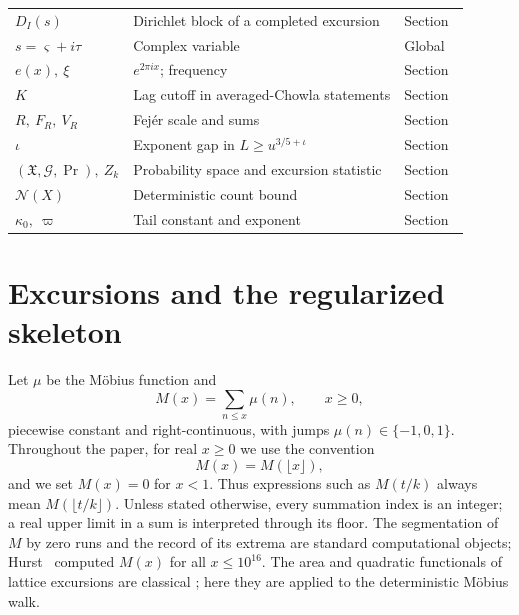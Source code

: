 \documentclass[11pt,reqno]{amsart}
\makeatletter
\let\CG@origref\ref
\newcommand{\CG@gettip}[1]{\@ifundefined{CGTip@#1}{Reference: #1}{\csname CGTip@#1\endcsname}}
\DeclareRobustCommand{\CGref}[1]{\pdftooltip{\CG@origref{#1}}{\CG@gettip{#1}}}
\let\CG@origcite\cite
\renewcommand*{\cite}[2][]{\def\CG@citekey{#2}%
  \ifx\relax#1\relax\CG@origcite{#2}\else\CG@origcite[#1]{#2}\fi}
\numberwithin{equation}{section}
\theoremstyle{plain}
\theoremstyle{definition}
\theoremstyle{remark}
\makeatother
\begin{document}
\begin{longtable}{@{}p{}p{}p{}@{}}
$D_I(s)$ & Dirichlet block of a completed excursion & Section~\CGref{sec:criteria}\\
$s=\varsigma+i\tau$ & Complex variable & Global\\
$e(x),\ \xi$ & $e^{2\pi ix}$; frequency & Section~\CGref{sec:chowla}\\
$K$ & Lag cutoff in averaged-Chowla statements & Section~\CGref{sec:chowla}\\
$R,\ F_R,\ V_R$ & Fejér scale and sums & Section~\CGref{sec:chowla}\\
$\iota$ & Exponent gap in $L\ge u^{3/5+\iota}$ & Section~\CGref{sec:chowla}\\
$(\mathfrak X,\mathcal G,\Pr),\ Z_k$ & Probability space and excursion statistic & Section~\CGref{sec:extreme}\\
$\mathcal N(X)$ & Deterministic count bound & Section~\CGref{sec:extreme}\\
$\kappa_0,\ \varpi$ & Tail constant and exponent & Section~\CGref{sec:extreme}\\
\bottomrule
\end{longtable}
\normalsize

\section{Excursions and the regularized skeleton}
\label{sec:definitions}

Let $\mu$ be the M\"obius function and
\begin{equation}
\label{eq:mertens_def}
M(x)=\sum_{n\le x}\mu(n),\qquad x\ge0,
\end{equation}
piecewise constant and right-continuous, with jumps $\mu(n)\in\{-1,0,1\}$.
Throughout the paper, for real $x\ge0$ we use the convention
\begin{equation}
M(x)=M(\lfloor x\rfloor),
\end{equation}
and we set $M(x)=0$ for $x<1$. Thus expressions such as $M(t/k)$ always
mean $M(\lfloor t/k\rfloor)$. Unless stated otherwise, every summation index is an integer; a real upper limit in a sum is interpreted through its floor. The segmentation of $M$ by zero runs and the record of its
extrema are standard computational objects; Hurst~\cite{Hurst18} computed
$M(x)$ for all $x\le10^{16}$. The area and quadratic functionals of lattice
excursions are classical
\cite{Takacs91,NguyenThe04,Richard05,Janson07,DKW15,CP17}; here they are
applied to the deterministic M\"obius walk.
\end{document}

